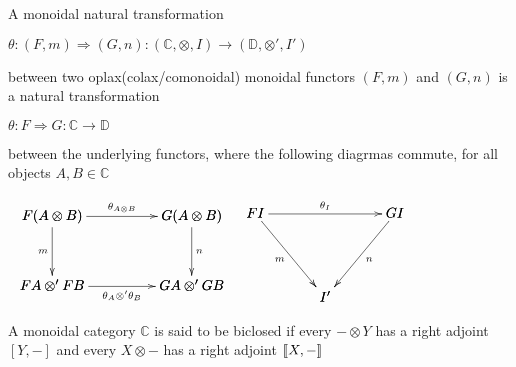 \begin{definition}
\label{def:oplax_monoidal_natural_transformation}
    A monoidal natural transformation
    \begin{center}
        \begin{math}
            \theta : (F,m) \Rightarrow (G,n) : (\mathbb{C}, \otimes, I) \rightarrow (\mathbb{D}, \otimes ', I')
        \end{math}
    \end{center}
    between two oplax(colax/comonoidal) monoidal functors $(F,m)$ and $(G,n)$ is a natural transformation
    \begin{center}
        \begin{math}
            \theta : F \Rightarrow G : \mathbb{C} \rightarrow \mathbb{D}
        \end{math}
    \end{center}
    between the underlying functors, where the following diagrmas commute, for all objects $A,B \in \mathbb{C}$
    \begin{center}
        \begin{math}
            \begin{array}{rl}
                \bfig
                    \square<1000,500>[
                        F(A \otimes B)`
                        G(A \otimes B)`
                        FA \otimes ' FB`
                        GA \otimes ' GB;
                        \theta_{A \otimes B}`
                        m`
                        n`
                        \theta_A \otimes ' \theta_B
                    ]
                \efig
                &
                \bfig
                    \Vtriangle<500,600>[
                        FI`
                        GI`
                        I';
                        \theta_I`
                        m`
                        n
                    ]
                \efig
            \end{array}
        \end{math}
    \end{center}
    \cite{mellies2009}
\end{definition}


\begin{definition}
\label{def:biclosed_monoidal_category}
    A monoidal category $\mathbb{C}$ is said to be biclosed if every $- \otimes Y$ has a right adjoint $[Y,-]$ and every 
    $X \otimes -$ has a right adjoint $[\negthinspace[X,-]\negthinspace]$ \cite{kelly1982}
\end{definition}


